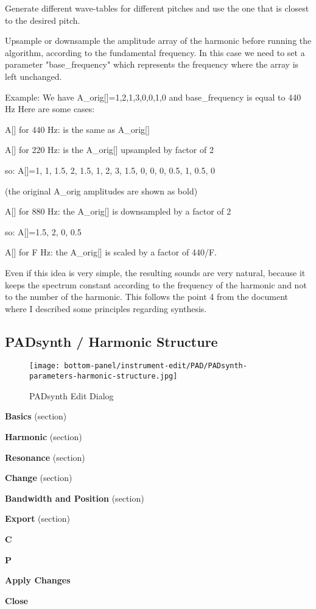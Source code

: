    Generate different wave-tables for different pitches and use the one that
   is closest to the desired pitch.

   Upsample or downsample the amplitude array of the harmonic before running
   the algorithm, according to the fundamental frequency. In this case we need
   to set a parameter "base\_frequency" which represents the frequency where
   the array is left unchanged. 

   Example:
   We have A\_orig[]={1,2,1,3,0,0,1,0} and base\_frequency is equal to 440 Hz
   Here are some cases:

A[] for 440 Hz: is the same as A\_orig[] 

A[] for 220 Hz: is the A\_orig[] upsampled by factor of 2

so: A[]={1, 1, 1.5, 2, 1.5, 1, 2, 3, 1.5, 0, 0, 0, 0.5, 1, 0.5, 0}

(the original A\_orig amplitudes are shown as bold) 

A[] for 880 Hz: the A\_orig[] is downsampled by a factor of 2

so: A[]={1.5, 2, 0, 0.5} 

A[] for F Hz: the A\_orig[] is scaled by a factor of 440/F.

   Even if this idea is very simple, the resulting sounds are very natural,
   because it keeps the spectrum constant according to the frequency of the
   harmonic and not to the number of the harmonic. This follows the point 4
   from the document where I described some principles regarding synthesis.

\subsection{PADsynth / Harmonic Structure}
\label{subsec:padsynth_harmonic_structure}

\begin{figure}[H]
   \centering 
   \texttt{[image: bottom-panel/instrument-edit/PAD/PADsynth-parameters-harmonic-structure.jpg]}
   \caption{PADsynth Edit Dialog}
   \label{fig:padsynth_edit_dialog}
\end{figure}

   \begin{enumber}
      \item \textbf{Basics} (section)
      \item \textbf{Harmonic} (section)
      \item \textbf{Resonance} (section)
      \item \textbf{Change} (section)
      \item \textbf{Bandwidth and Position} (section)
      \item \textbf{Export} (section)
      \item \textbf{C}
      \item \textbf{P}
      \item \textbf{Apply Changes}
      \item \textbf{Close}
   \end{enumber}

